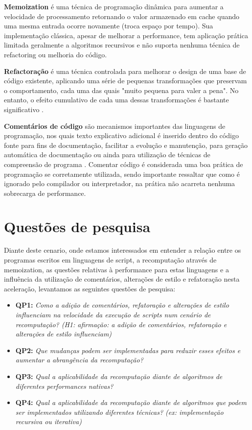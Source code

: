 \documentclass[sigconf]{acmart}
\begin{document}
\textbf{Memoization} é uma técnica de programação dinâmica para aumentar a velocidade de processamento retornando o valor armazenado em cache quando uma mesma entrada ocorre novamente (troca espaço por tempo). Sua implementação clássica, apesar de melhorar a performance, tem aplicação prática limitada geralmente a algoritmos recursivos e não suporta nenhuma técnica de refactoring ou melhoria do código.

\textbf{Refactoração} é uma técnica controlada para melhorar o design de uma base de código existente, aplicando uma série de pequenas transformações que preservam o comportamento, cada uma das quais "muito pequena para valer a pena". No entanto, o efeito cumulativo de cada uma dessas transformações é bastante significativo \cite{fowler2018refactoring}.

\textbf{Comentários de código} são mecanismos importantes das linguagens de programação, nos quais texto explicativo adicional é inserido dentro do código fonte para fins de documentação, facilitar a evolução e manutenção, para geração automática de documentação ou ainda para utilização de técnicas de compreensão de programa \cite{vinz2008improving}. Comentar código é considerada uma boa prática de programação se corretamente utilizada, sendo importante ressaltar que como é ignorado pelo compilador ou interpretador, na prática não acarreta nenhuma sobrecarga de performance.

\section{Questões de pesquisa}
Diante deste cenario, onde estamos interessados em entender a relação entre os programas escritos em linguagens de script, a recomputação através de memoization, as questões relativas à performance para estas linguagens e a influência da utilização de comentários, alterações de estilo e refatoração nesta aceleração, levantamos as seguintes questões de pesquisa:

\begin{itemize}
\item \textbf{QP1:} {\textit{Como a adição de comentários, refatoração e alterações de estilo influenciam na velocidade da execução de scripts num cenário de recomputação? (H1: afirmação: a adição de comentários, refatoração e alterações de estilo influenciam)}}
\item \textbf{QP2:} {\textit{Que mudanças podem ser implementadas para reduzir esses efeitos e aumentar a abrangência da recomputação?}}
\item \textbf{QP3:} {\textit{Qual a aplicabilidade da recomputação diante de algoritmos de diferentes performances nativas?}}
\item \textbf{QP4:} {\textit{Qual a aplicabilidade da recomputação diante de algoritmos que podem ser implementados utilizando diferentes técnicas? (ex: implementação recursiva ou iterativa)}}
\end{itemize}
\end{document}
